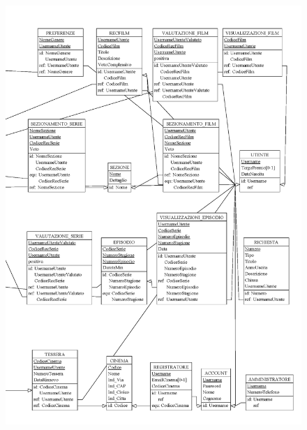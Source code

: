 \documentclass[a4paper,12pt]{report}
\begin{document}
\begin{figure}[H]
	\centering
	\includegraphics[width=350pt]{ER/schemalogico/logicdx.png}
\end{figure}
\end{document}
